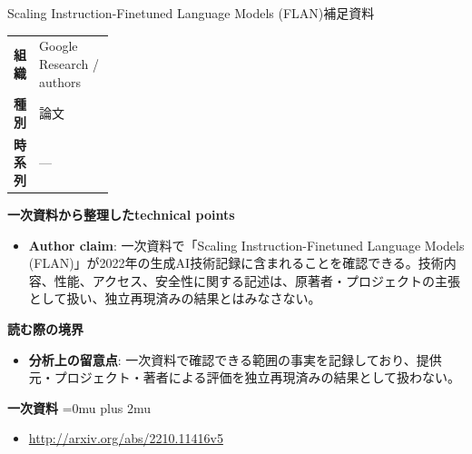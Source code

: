 \begin{technicalnote}{Scaling Instruction-Finetuned Language Models (FLAN)}{補足資料}
\begingroup
\begin{tabularx}{\linewidth}{@{}>{\bfseries}p{0.22\linewidth}X@{}}
組織 & Google Research / authors \\
種別 & 論文 \\
時系列 & — \\
\end{tabularx}
\smallskip
{\bfseries 一次資料から整理したtechnical points}
\begin{itemize}[leftmargin=1.5em,itemsep=0.35em]
\item \textbf{Author claim}: 一次資料で「Scaling Instruction-Finetuned Language Models (FLAN)」が2022年の生成AI技術記録に含まれることを確認できる。技術内容、性能、アクセス、安全性に関する記述は、原著者・プロジェクトの主張として扱い、独立再現済みの結果とはみなさない。
\end{itemize}
\begin{minipage}{\linewidth}
{\bfseries 読む際の境界}
\begin{itemize}[leftmargin=1.5em,itemsep=0.35em]
\item \textbf{分析上の留意点}: 一次資料で確認できる範囲の事実を記録しており、提供元・プロジェクト・著者による評価を独立再現済みの結果として扱わない。
\end{itemize}
\begin{samepage}
{\bfseries 一次資料}
\begingroup\sloppy
\Urlmuskip=0mu plus 2mu\relax
\begin{itemize}[leftmargin=1.5em,itemsep=0.25em]
\item {\scriptsize\url{http://arxiv.org/abs/2210.11416v5}}
\end{itemize}
\endgroup
\end{samepage}
\end{minipage}
\endgroup
\end{technicalnote}
\medskip

